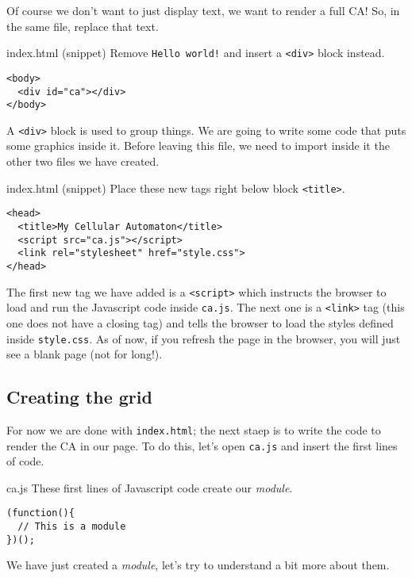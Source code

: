 Of course we don't want to just display text, we want to render a full CA! So, in the same file, replace
that text.

\begin{programcode}{index.html (snippet)}
Remove \texttt{Hello world!} and insert a \texttt{<div>} block instead.
\begin{verbatim}
<body>
  <div id="ca"></div>
</body>
\end{verbatim}
\end{programcode}

A \texttt{<div>} block is used to group things. We are going to write some code that puts some graphics
inside it. Before leaving this file, we need to import inside it the other two files we have created.

\begin{programcode}{index.html (snippet)}
Place these new tags right below block \texttt{<title>}.
\begin{verbatim}
<head>
  <title>My Cellular Automaton</title>
  <script src="ca.js"></script>
  <link rel="stylesheet" href="style.css">
</head>
\end{verbatim}
\end{programcode}

The first new tag we have added is a \texttt{<script>} which instructs the browser to load and run the
Javascript code inside \texttt{ca.js}. The next one is a \texttt{<link>} tag (this one does not have a closing tag)
and tells the browser to load the styles defined inside \texttt{style.css}. As of now, if you refresh the
page in the browser, you will just see a blank page (not for long!).

\subsection{Creating the grid}
For now we are done with \texttt{index.html}; the next staep is to write the code to render the CA
in our page. To do this, let's open \texttt{ca.js} and insert the first lines of code.

\begin{programcode}{ca.js}
These first lines of Javascript code create our \textit{module}.
\begin{verbatim}
(function(){
  // This is a module
})();
\end{verbatim}
\end{programcode}

We have just created a \textit{module}, let's try to understand a bit more about them.

